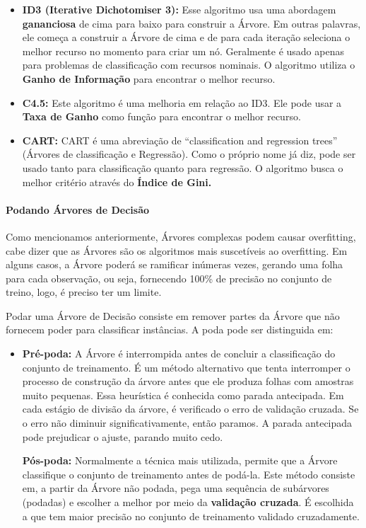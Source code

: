 \documentclass[
  letterpaper,
  DIV=11,
  numbers=noendperiod]{scrreprt}
\let\oldparagraph\paragraph
\renewcommand{\paragraph}[1]{\oldparagraph{#1}\mbox{}}
\begin{document}
\begin{itemize}
\item
  \textbf{ID3 (Iterative Dichotomiser 3):} Esse algoritmo usa uma
  abordagem \textbf{gananciosa} de cima para baixo para construir a
  Árvore. Em outras palavras, ele começa a construir a Árvore de cima e
  de para cada iteração seleciona o melhor recurso no momento para criar
  um nó. Geralmente é usado apenas para problemas de classificação com
  recursos nominais. O algoritmo utiliza o \textbf{Ganho de Informação}
  para encontrar o melhor recurso.
\item
  \textbf{C4.5:} Este algoritmo é uma melhoria em relação ao ID3. Ele
  pode usar a \textbf{Taxa de Ganho} como função para encontrar o melhor
  recurso.
\item
  \textbf{CART:} CART é uma abreviação de ``classification and
  regression trees'' (Árvores de classificação e Regressão). Como o
  próprio nome já diz, pode ser usado tanto para classificação quanto
  para regressão. O algoritmo busca o melhor critério através do
  \textbf{Índice de Gini.}
\end{itemize}

\hypertarget{podando-uxe1rvores-de-decisuxe3o}{%
\paragraph{Podando Árvores de
Decisão}\label{podando-uxe1rvores-de-decisuxe3o}}

Como mencionamos anteriormente, Árvores complexas podem causar
overfitting, cabe dizer que as Árvores são os algoritmos mais
suscetíveis ao overfitting. Em alguns casos, a Árvore poderá se
ramificar inúmeras vezes, gerando uma folha para cada observação, ou
seja, fornecendo 100\% de precisão no conjunto de treino, logo, é
preciso ter um limite.

Podar uma Árvore de Decisão consiste em remover partes da Árvore que não
fornecem poder para classificar instâncias. A poda pode ser distinguida
em:

\begin{itemize}
\item
  \textbf{Pré-poda:} A Árvore é interrompida antes de concluir a
  classificação do conjunto de treinamento. É um método alternativo que
  tenta interromper o processo de construção da árvore antes que ele
  produza folhas com amostras muito pequenas. Essa heurística é
  conhecida como parada antecipada. Em cada estágio de divisão da
  árvore, é verificado o erro de validação cruzada. Se o erro não
  diminuir significativamente, então paramos. A parada antecipada pode
  prejudicar o ajuste, parando muito cedo.

  \textbf{Pós-poda:} Normalmente a técnica mais utilizada, permite que a
  Árvore classifique o conjunto de treinamento antes de podá-la. Este
  método consiste em, a partir da Árvore não podada, pega uma sequência
  de subárvores (podadas) e escolher a melhor por meio da
  \textbf{validação cruzada}. É escolhida a que tem maior precisão no
  conjunto de treinamento validado cruzadamente.
\end{itemize}
\end{document}
